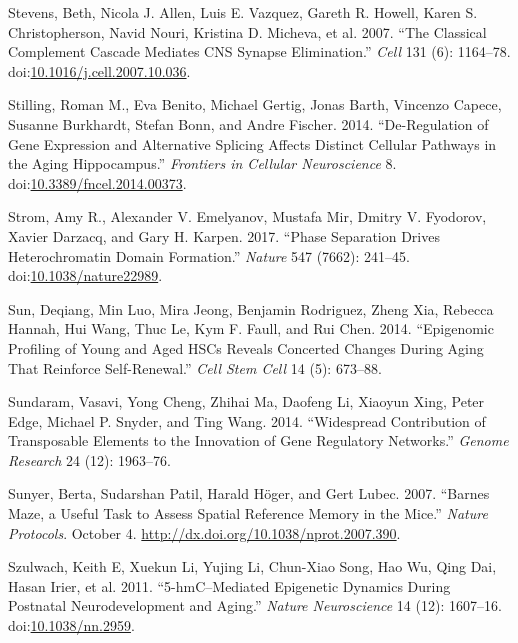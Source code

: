 \documentclass[onehalf,12pt]{beavtex}
\begin{document}
  \hypertarget{ref-StevensClassicalComplementCascade2007}{}
  Stevens, Beth, Nicola J. Allen, Luis E. Vazquez, Gareth R. Howell, Karen
  S. Christopherson, Navid Nouri, Kristina D. Micheva, et al. 2007. ``The
  Classical Complement Cascade Mediates CNS Synapse Elimination.''
  \emph{Cell} 131 (6): 1164--78.
  doi:\href{https://doi.org/10.1016/j.cell.2007.10.036}{10.1016/j.cell.2007.10.036}.
  
  \hypertarget{ref-StillingDeregulationgeneexpression2014}{}
  Stilling, Roman M., Eva Benito, Michael Gertig, Jonas Barth, Vincenzo
  Capece, Susanne Burkhardt, Stefan Bonn, and Andre Fischer. 2014.
  ``De-Regulation of Gene Expression and Alternative Splicing Affects
  Distinct Cellular Pathways in the Aging Hippocampus.'' \emph{Frontiers
  in Cellular Neuroscience} 8.
  doi:\href{https://doi.org/10.3389/fncel.2014.00373}{10.3389/fncel.2014.00373}.
  
  \hypertarget{ref-StromPhaseseparationdrives2017}{}
  Strom, Amy R., Alexander V. Emelyanov, Mustafa Mir, Dmitry V. Fyodorov,
  Xavier Darzacq, and Gary H. Karpen. 2017. ``Phase Separation Drives
  Heterochromatin Domain Formation.'' \emph{Nature} 547 (7662): 241--45.
  doi:\href{https://doi.org/10.1038/nature22989}{10.1038/nature22989}.
  
  \hypertarget{ref-SunEpigenomicprofilingyoung2014}{}
  Sun, Deqiang, Min Luo, Mira Jeong, Benjamin Rodriguez, Zheng Xia,
  Rebecca Hannah, Hui Wang, Thuc Le, Kym F. Faull, and Rui Chen. 2014.
  ``Epigenomic Profiling of Young and Aged HSCs Reveals Concerted Changes
  During Aging That Reinforce Self-Renewal.'' \emph{Cell Stem Cell} 14
  (5): 673--88.
  
  \hypertarget{ref-SundaramWidespreadcontributiontransposable2014}{}
  Sundaram, Vasavi, Yong Cheng, Zhihai Ma, Daofeng Li, Xiaoyun Xing, Peter
  Edge, Michael P. Snyder, and Ting Wang. 2014. ``Widespread Contribution
  of Transposable Elements to the Innovation of Gene Regulatory
  Networks.'' \emph{Genome Research} 24 (12): 1963--76.
  
  \hypertarget{ref-SunyerBarnesmazeuseful2007}{}
  Sunyer, Berta, Sudarshan Patil, Harald Höger, and Gert Lubec. 2007.
  ``Barnes Maze, a Useful Task to Assess Spatial Reference Memory in the
  Mice.'' \emph{Nature Protocols}. October 4.
  \url{http://dx.doi.org/10.1038/nprot.2007.390}.
  
  \hypertarget{ref-Szulwach5hmCmediatedepigenetic2011}{}
  Szulwach, Keith E, Xuekun Li, Yujing Li, Chun-Xiao Song, Hao Wu, Qing
  Dai, Hasan Irier, et al. 2011. ``5-hmC--Mediated Epigenetic Dynamics
  During Postnatal Neurodevelopment and Aging.'' \emph{Nature
  Neuroscience} 14 (12): 1607--16.
  doi:\href{https://doi.org/10.1038/nn.2959}{10.1038/nn.2959}.
  
\end{document}
